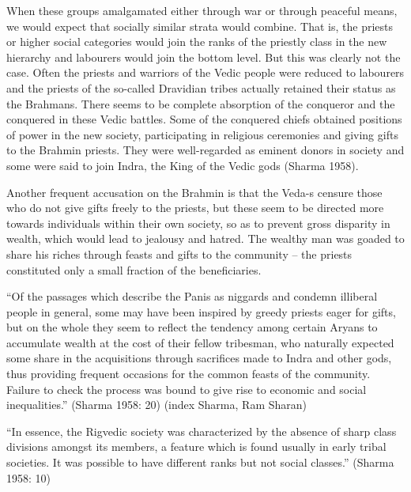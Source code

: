 When these groups amalgamated either through war or through peaceful means, we would expect that socially similar strata would combine. That is, the priests or higher social categories would join the ranks of the priestly class in the new hierarchy and labourers would join the bottom level. But this was clearly not the case. Often the priests and warriors of the Vedic people were reduced to labourers and the priests of the so-called Dravidian tribes actually retained their status as the Brahmans. There seems to be complete absorption of the conqueror and the conquered in these Vedic battles. Some of the conquered chiefs obtained positions of power in the new society, participating in religious ceremonies and giving gifts to the Brahmin priests. They were well-regarded as eminent donors in society and some were said to join Indra, the King of the Vedic gods (Sharma 1958).

Another frequent accusation on the Brahmin is that the Veda-s censure those who do not give gifts freely to the priests, but these seem to be directed more towards individuals within their own society, so as to prevent gross disparity in wealth, which would lead to jealousy and hatred. The wealthy man was goaded to share his riches through feasts and gifts to the community – the priests constituted only a small fraction of the beneficiaries.

\begin{myquote}
“Of the passages which describe the Panis as niggards and condemn illiberal people in general, some may have been inspired by greedy priests eager for gifts, but on the whole they seem to reflect the tendency among certain Aryans to accumulate wealth at the cost of their fellow tribesman, who naturally expected some share in the acquisitions through sacrifices made to Indra and other gods, thus providing frequent occasions for the common feasts of the community. Failure to check the process was bound to give rise to economic and social inequalities.” (Sharma 1958: 20) (index Sharma, Ram Sharan)
\end{myquote}

\begin{myquote}
“In essence, the Rigvedic society was characterized by the absence of sharp class divisions amongst its members, a feature which is found usually in early tribal societies. It was possible to have different ranks but not social classes.” (Sharma 1958: 10)
\end{myquote}

